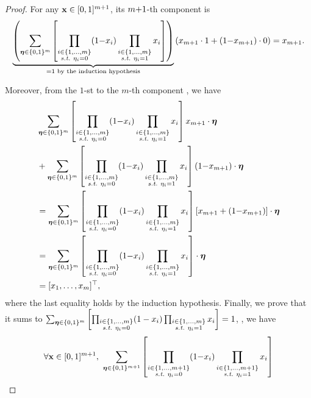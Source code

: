 \begin{noaddcontents}
\begin{proof}
For any $\mathbf{x}\in[0, 1]^{m+1}$, its $m{+}1$-th component is
\begin{align*}
    \underbrace{\left(\sum_{\boldsymbol{\eta}\in\{0,1\}^{m}} \left[ \prod_{\substack{i\in\{1,\dots,m\}\\ \text{{\it s.t.}}\ \eta_i=0}} (1{-}x_i)\prod_{\substack{i\in\{1,\dots,m\}\\ \text{{\it s.t.}}\ \eta_i=1}} x_i \right]\right)}_{=1 \text{ by the induction hypothesis}}\left( x_{m+1}\cdot1 + (1{-}x_{m+1})\cdot0\right) = x_{m+1}.
\end{align*}

Moreover, from the $1$-st to the $m$-th component , we have
\begingroup
\allowdisplaybreaks
\begin{align*}
    &\sum_{\boldsymbol{\eta}\in\{0,1\}^{m}} \left[ \prod_{\substack{i\in\{1,\dots,m\}\\ \text{{\it s.t.}}\ \eta_i=0}} (1{-}x_i)\prod_{\substack{i\in\{1,\dots,m\}\\ \text{{\it s.t.}}\ \eta_i=1}} x_i \right] x_{m+1}\cdot\boldsymbol{\eta}\\
    &+ \sum_{\boldsymbol{\eta}\in\{0,1\}^{m}} \left[ \prod_{\substack{i\in\{1,\dots,m\}\\ \text{{\it s.t.}}\ \eta_i=0}} (1{-}x_i)\prod_{\substack{i\in\{1,\dots,m\}\\ \text{{\it s.t.}}\ \eta_i=1}} x_i \right] (1{-}x_{m+1})\cdot\boldsymbol{\eta}\\
    &= \sum_{\boldsymbol{\eta}\in\{0,1\}^{m}} \left[ \prod_{\substack{i\in\{1,\dots,m\}\\ \text{{\it s.t.}}\ \eta_i=0}} (1{-}x_i)\prod_{\substack{i\in\{1,\dots,m\}\\ \text{{\it s.t.}}\ \eta_i=1}} x_i \right]\left[ x_{m+1} + (1{-}x_{m+1}) \right] \cdot \boldsymbol{\eta}\\
    &= \sum_{\boldsymbol{\eta}\in\{0,1\}^{m}} \left[ \prod_{\substack{i\in\{1,\dots,m\}\\ \text{{\it s.t.}}\ \eta_i=0}} (1{-}x_i)\prod_{\substack{i\in\{1,\dots,m\}\\ \text{{\it s.t.}}\ \eta_i=1}} x_i \right]\cdot \boldsymbol{\eta}\\
    &= [x_1, \dots, x_{m}]^\top,
\end{align*}
\endgroup
where the last equality holds by the induction hypothesis.
Finally, we prove that it sums to $\sum_{\boldsymbol{\eta}\in\{0,1\}^m} \left[ \prod_{\substack{i\in\{1,\dots,m\}\\ \text{{\it s.t.}}\ \eta_i=0}} (1-x_i)\prod_{\substack{i\in\{1,\dots,m\}\\ \text{{\it s.t.}}\ \eta_i=1}} x_i \right]=1$, \ie, we have
\begin{align*}
    \forall \x\in[0, 1]^{\m+1},\ &\sum_{\etabf\in\{0,1\}^{\m+1}} \LB \prod_{\substack{i\in\{1,\dots,\m+1\}\\ \text{\st}\ \eta_i=0}} (1{-}x_i)\prod_{\substack{i\in\{1,\dots,\m+1\}\\ \text{\st}\ \eta_i=1}} x_i \RB\\

\end{align*}
\end{proof}
\end{noaddcontents}
